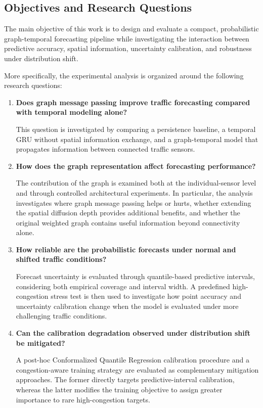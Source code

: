 \subsection{Objectives and Research Questions}
\label{subsec:objectives}

The main objective of this work is to design and evaluate a compact,
probabilistic graph-temporal forecasting pipeline while investigating the
interaction between predictive accuracy, spatial information, uncertainty
calibration, and robustness under distribution shift.

More specifically, the experimental analysis is organized around the
following research questions:

\begin{enumerate}
    \item \textbf{Does graph message passing improve traffic forecasting
    compared with temporal modeling alone?}

    This question is investigated by comparing a persistence baseline, a
    temporal GRU without spatial information exchange, and a graph-temporal
    model that propagates information between connected traffic sensors.

    \item \textbf{How does the graph representation affect forecasting
    performance?}

    The contribution of the graph is examined both at the individual-sensor
    level and through controlled architectural experiments. In particular,
    the analysis investigates where graph message passing helps or hurts,
    whether extending the spatial diffusion depth provides additional
    benefits, and whether the original weighted graph contains useful
    information beyond connectivity alone.

    \item \textbf{How reliable are the probabilistic forecasts under normal
    and shifted traffic conditions?}

    Forecast uncertainty is evaluated through quantile-based predictive
    intervals, considering both empirical coverage and interval width. A
    predefined high-congestion stress test is then used to investigate how
    point accuracy and uncertainty calibration change when the model is
    evaluated under more challenging traffic conditions.

    \item \textbf{Can the calibration degradation observed under
    distribution shift be mitigated?}

    A post-hoc Conformalized Quantile Regression calibration procedure and a
    congestion-aware training strategy are evaluated as complementary mitigation
    approaches. The former directly targets predictive-interval calibration,
    whereas the latter modifies the training objective to assign greater
    importance to rare high-congestion targets.
\end{enumerate}

